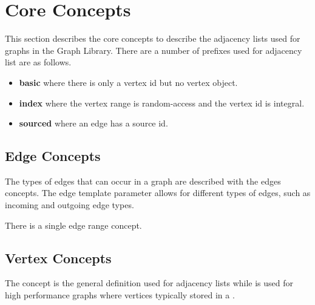 


\section{Core Concepts}

This section describes the core concepts to describe the adjacency lists used for graphs in the Graph Library. There are a 
number of prefixes used for adjacency list are as follows.
\begin{itemize}
    \item \textbf{basic} where there is only a vertex id but no vertex object.
    \item \textbf{index} where the vertex range is random-access and the vertex id is integral.
    \item \textbf{sourced} where an edge has a source id.
\end{itemize}

\subsection{Edge Concepts}
The types of edges that can occur in a graph are described with the edges concepts. The  edge template parameter allows
for different types of edges, such as incoming and outgoing edge types.
{\small
     
}

There is a single edge range concept.



{\small
     
}

\subsection{Vertex Concepts}
The  concept is the general definition used for adjacency lists while  is used for
high performance graphs where vertices typically stored in a .
{\small
     
}

